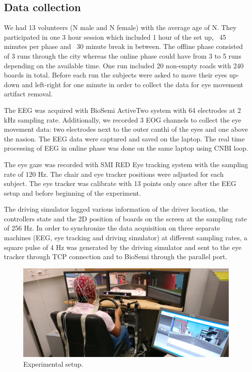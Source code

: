 \documentclass[12pt]{iopart}
\begin{document}
\subsection{Data collection}
We had 13 volunteers (N male and N female) with the average age of N.
They participated in one 3 hour session which included
1 hour of the set up, ~45 minutes per phase and ~30 minute break in between.
The offline phase consisted of 3 runs through the city  whereas the online
phase could have from 3 to 5 runs depending on the available time.
One run included 20 non-empty roads with 240 boards in total.
Before each run the subjects were asked to move their eyes up-down and left-right
for one minute in order to collect the data for eye movement artifact removal.

The EEG was acquired with BioSemi ActiveTwo system with 64 electrodes at 2 kHz sampling rate.
Additionally, we recorded 3 EOG channels to collect the eye movement data:
two electrodes next to the outer canthi of the eyes and one above the nasion.
The EEG data were captured and saved on the laptop. The real time processing
of EEG in online phase was done on the same laptop using CNBI loop.

The eye gaze was recorded with SMI RED Eye tracking system with the sampling rate of 120 Hz.
The chair and eye tracker positions were adjusted for each subject. The eye tracker
was calibrate with 13 points only once after the EEG setup and before beginning of 
the experiment.

The driving simulator logged various information of the driver location,
the controllers state and the 2D position of boards on the screen at the sampling rate
of 256 Hz. In order to synchronize the data acquisition on three separate machines
(EEG, eye tracking and driving simulator) at different sampling rates,
a square pulse of 4 Hz was generated by the driving simulator and sent 
to the eye tracker through TCP connection and to BioSemi through the parallel port.



\begin{figure}[!t]
    \includegraphics[trim={0cm 0cm 0cm 0cm},clip,width=0.6\columnwidth]{../images/Driving-photo.jpg}
    \caption{Experimental setup.}
\label{fig:setup}
\end{figure}
\end{document}
